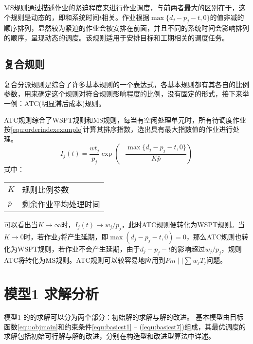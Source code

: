 MS规则通过描述作业的紧迫程度来进行作业调度，与前两者最大的区别在于，这个规则是动态的，即和系统时间$t$相关。作业根据$\max \{d_j - p_j - t , 0\}$的值非减的顺序排列，显然较为紧迫的作业会被安排在前面，并且不同的系统时间会影响排列的顺序，呈现动态的调度。该规则适用于安排目标和工期相关的调度任务。
\subsection{复合规则}
复合分派规则是综合了许多基本规则的一个表达式，各基本规则都有其各自的比例参数，用来确定这个规则对符合规则影响程度的比例，没有固定的形式，接下来举一例：ATC(明显滞后成本)规则。

ATC规则综合了WSPT规则和MS规则，每当有空闲处理单元时，所有待调度作业按\eqref{equ:orderindexexample}计算其排序指数，选出具有最大指数值的作业进行处理。
\begin{equation}
I_j(t) = \frac{wt_j}{p_j}\exp\left(-\frac{\max\{d_j - p_j - t, 0\}}{K\bar p}\right) \label{equ:orderindexexample}
\end{equation}
式中：

\begin{tabular}{ll}
$K$ & 规则比例参数\\
$\bar p$ &剩余作业平均处理时间
\end{tabular}

可以看出当$K \to \infty$时，$I_j(t) \to w_j/p_j$，此时ATC规则便转化为WSPT规则。当$K \to 0$时，若作业$j$将产生延期，即$\max(d_j - p_j -t , 0 ) = 0$，那么ATC规则也转化为WSPT规则，若作业不会产生延期，由于$d_j - p_j - t$的影响超过$w_j/p_j$，规则ATC将转化为MS规则。ATC规则可以较容易地应用到$Pm\mid\mid \sum w_jT_j$问题。

\section{模型1 求解分析}
模型1 的的求解可以分为两个部分：初始解的求解与解的改进。
基本模型由目标函数\eqref{equ:objmain}和约束条件\eqref{equ:basicst1} -- (\ref{equ:basicst7})组成，其最优调度的求解包括初始可行解与解的改进，分别在构造型和改进型算法中详述。
